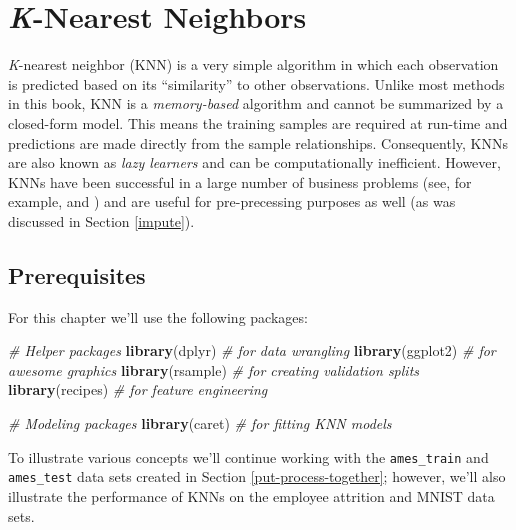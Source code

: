 \documentclass[]{krantz}
\makeatletter
\newenvironment{Shaded}{\begin{snugshade}}{\end{snugshade}}
\newcommand{\CommentTok}[1]{\textcolor[rgb]{0.37,0.37,0.37}{\textit{#1}}}
\newcommand{\KeywordTok}[1]{\textcolor[rgb]{0.27,0.27,0.27}{\textbf{#1}}}
\newcommand{\NormalTok}[1]{#1}
\newenvironment{kframe}{%
\medskip{}
\setlength{\fboxsep}{.8em}
 \def\at@end@of@kframe{}%
 \ifinner\ifhmode%
  \def\at@end@of@kframe{\end{minipage}}%
  \begin{minipage}{\columnwidth}%
 \fi\fi%
 \def\FrameCommand##1{\hskip\@totalleftmargin \hskip-\fboxsep
 \colorbox{shadecolor}{##1}\hskip-\fboxsep
     \hskip-\linewidth \hskip-\@totalleftmargin \hskip\columnwidth}%
 \MakeFramed {\advance\hsize-\width
   \@totalleftmargin\z@ \linewidth\hsize
   \@setminipage}}%
 {\par\unskip\endMakeFramed%
 \at@end@of@kframe}
\renewenvironment{Shaded}{\begin{kframe}}{\end{kframe}}
\makeatother
\begin{document}
\hypertarget{knn}{%
\chapter{\texorpdfstring{\emph{K}-Nearest Neighbors}{K-Nearest Neighbors}}\label{knn}}

\emph{K}-nearest neighbor (KNN) is a very simple algorithm in which each observation is predicted based on its ``similarity'' to other observations. Unlike most methods in this book, KNN is a \emph{memory-based} algorithm and cannot be summarized by a closed-form model. This means the training samples are required at run-time and predictions are made directly from the sample relationships. Consequently, KNNs are also known as \emph{lazy learners} \citep{cunningham2007k} and can be computationally inefficient. However, KNNs have been successful in a large number of business problems (see, for example, \citet{jiang2012improved} and \citet{mccord2011spam}) and are useful for pre-precessing purposes as well (as was discussed in Section \ref{impute}).

\hypertarget{prerequisites-6}{%
\section{Prerequisites}\label{prerequisites-6}}

For this chapter we'll use the following packages:

\begin{Shaded}
\begin{Highlighting}[]
\CommentTok{# Helper packages}
\KeywordTok{library}\NormalTok{(dplyr)      }\CommentTok{# for data wrangling}
\KeywordTok{library}\NormalTok{(ggplot2)    }\CommentTok{# for awesome graphics}
\KeywordTok{library}\NormalTok{(rsample)    }\CommentTok{# for creating validation splits}
\KeywordTok{library}\NormalTok{(recipes)    }\CommentTok{# for feature engineering}

\CommentTok{# Modeling packages}
\KeywordTok{library}\NormalTok{(caret)       }\CommentTok{# for fitting KNN models}
\end{Highlighting}
\end{Shaded}

To illustrate various concepts we'll continue working with the \texttt{ames\_train} and \texttt{ames\_test} data sets created in Section \ref{put-process-together}; however, we'll also illustrate the performance of KNNs on the employee attrition and MNIST data sets.
\end{document}
